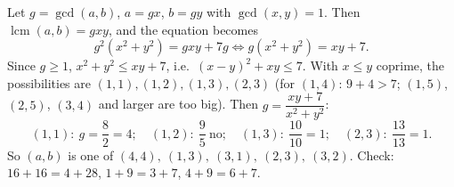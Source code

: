 Let $g=\gcd(a,b)$, $a=gx$, $b=gy$ with $\gcd(x,y)=1$. Then $\operatorname{lcm}(a,b)=gxy$, and the equation becomes
\[
g^2\left(x^2+y^2\right)=gxy+7g\iff g\left(x^2+y^2\right)=xy+7 .
\]
Since $g\ge1$, $x^2+y^2\le xy+7$, i.e.\ $(x-y)^2+xy\le7$. With $x\le y$ coprime, the possibilities are $(1,1),(1,2),(1,3),(2,3)$ (for $(1,4)$: $9+4>7$; $(1,5)$, $(2,5)$, $(3,4)$ and larger are too big). Then $g=\dfrac{xy+7}{x^2+y^2}$:
\[
(1,1):\ g=\dfrac{8}{2}=4;\quad (1,2):\ \dfrac{9}{5}\ \text{no};\quad (1,3):\ \dfrac{10}{10}=1;\quad (2,3):\ \dfrac{13}{13}=1 .
\]
So $(a,b)$ is one of $\boxed{(4,4),\ (1,3),\ (3,1),\ (2,3),\ (3,2)}$. Check: $16+16=4+28$, $1+9=3+7$, $4+9=6+7$.
